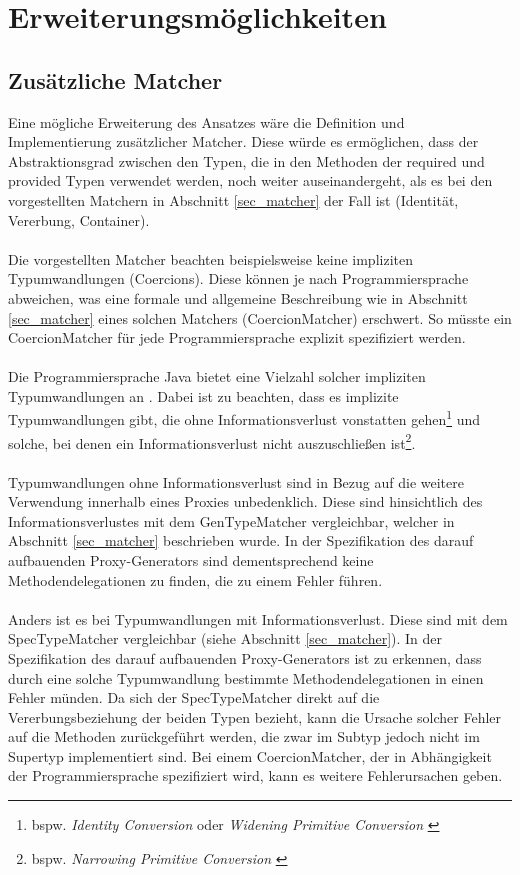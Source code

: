\section{Erweiterungsmöglichkeiten}
\subsection{Zusätzliche Matcher}
Eine mögliche Erweiterung des Ansatzes wäre die Definition und Implementierung zusätzlicher Matcher. Diese würde es ermöglichen, dass der Abstraktionsgrad zwischen den Typen, die in den Methoden der required und provided Typen verwendet werden, noch weiter auseinandergeht, als es bei den vorgestellten Matchern in Abschnitt \ref{sec_matcher} der Fall ist (Identität, Vererbung, Container).
\\\\
Die vorgestellten Matcher beachten beispielsweise keine impliziten Typumwandlungen (Coercions). Diese können je nach Programmiersprache abweichen, was eine formale und allgemeine Beschreibung wie in Abschnitt \ref{sec_matcher} eines solchen Matchers (CoercionMatcher) erschwert. So müsste ein CoercionMatcher für jede Programmiersprache explizit spezifiziert werden.
\\\\
Die Programmiersprache Java bietet eine Vielzahl solcher impliziten Typumwandlungen an \cite{conversions_and_promotions}. Dabei ist zu beachten, dass es implizite Typumwandlungen gibt, die ohne Informationsverlust vonstatten gehen\footnote{bspw. \emph{Identity Conversion} oder \emph{Widening Primitive Conversion} \cite{conversions_and_promotions}} und solche, bei denen ein Informationsverlust nicht auszuschließen ist\footnote{bspw. \emph{Narrowing Primitive Conversion} \cite{conversions_and_promotions}}. 
\\\\
Typumwandlungen ohne Informationsverlust sind in Bezug auf die weitere Verwendung innerhalb eines Proxies unbedenklich. Diese sind hinsichtlich des Informationsverlustes mit dem GenTypeMatcher vergleichbar, welcher in Abschnitt \ref{sec_matcher} beschrieben wurde. In der Spezifikation des darauf aufbauenden Proxy-Generators sind dementsprechend keine Methodendelegationen zu finden, die zu einem Fehler führen.
\\\\
Anders ist es bei Typumwandlungen mit Informationsverlust. Diese sind mit dem SpecTypeMatcher vergleichbar (siehe Abschnitt \ref{sec_matcher}). In der Spezifikation des darauf aufbauenden Proxy-Generators ist zu erkennen, dass durch eine solche Typumwandlung bestimmte Methodendelegationen in einen Fehler münden. Da sich der SpecTypeMatcher direkt auf die Vererbungsbeziehung der beiden Typen bezieht, kann die Ursache solcher Fehler auf die Methoden zurückgeführt werden, die zwar im Subtyp jedoch nicht im Supertyp implementiert sind. Bei einem CoercionMatcher, der in Abhängigkeit der Programmiersprache spezifiziert wird, kann es weitere Fehlerursachen geben.
